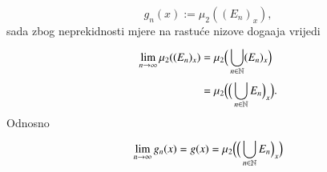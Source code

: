 \begin{rj}[\ref{zad:4.15}]
\begin{enumerate}[label=(\roman*)]
\begin{equation*}
            g_n (x) := \mu_2 ((E_n)_x),
        \end{equation*}
        sada zbog neprekidnosti mjere na rastu\' ce nizove doga\dj aja vrijedi
        \begin{equation*}
            \begin{aligned}
                \lim\limits_{n \to \infty} \mu_2 ((E_n)_x) &= \mu_2 \Big( \bigcup\limits_{n \in \mathbb{N}}^{} (E_n)_x \Big)\\
                &= \mu_2 \Big( \Big( \bigcup\limits_{n \in \mathbb{N}}^{} E_n \Big)_x \Big).
            \end{aligned}
        \end{equation*}
        Odnosno
        \begin{equation*}
            \lim\limits_{n \to \infty} g_n (x) = g (x) = \mu_2 \Big( \Big( \bigcup\limits_{n \in \mathbb{N}}^{} E_n  \Big)_x \Big)
        \end{equation*}
    \end{enumerate}
\end{rj}

